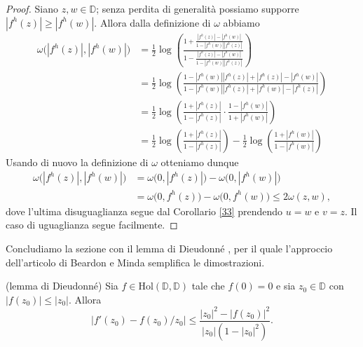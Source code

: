 \begin{proof}
  Siano $z, w \in \mathbb{D}$; senza perdita di generalità possiamo supporre $|f^h(z)| \ge |f^h(w)|$. Allora dalla definizione di $\omega$ abbiamo
  \begin{align*}
    \omega\bigl(|f^h(z)|, |f^h(w)|\bigr) & =\frac{1}{2}\log\left(\frac{1+\frac{|f^h(z)|-|f^h(w)|}{1-|f^h(w)||f^h(z)|}}{1-\frac{|f^h(z)|-|f^h(w)|}{1-|f^h(w)||f^h(z)|}}\right) \\
    & =\frac{1}{2}\log\left(\frac{1-|f^h(w)||f^h(z)|+|f^h(z)|-|f^h(w)|}{1-|f^h(w)||f^h(z)|+|f^h(w)|-|f^h(z)|}\right) \\
    & =\frac{1}{2}\log\left(\frac{1+|f^h(z)|}{1-|f^h(z)|}\cdot\frac{1-|f^h(w)|}{1+|f^h(w)|}\right) \\
    & =\frac{1}{2}\log\left(\frac{1+|f^h(z)|}{1-|f^h(z)|}\right)-\frac{1}{2}\log\left(\frac{1+|f^h(w)|}{1-|f^h(w)|}\right)
  \end{align*}
  Usando di nuovo la definizione di $\omega$ otteniamo dunque
  \begin{align*}
    \omega\bigl(|f^h(z)|, |f^h(w)|\bigr)&=\omega\bigl(0,|f^h(z)|\bigr)-\omega\bigl(0,|f^h(w)|\bigr) \\
    & =\omega\bigl(0,f^h(z)\bigr)-\omega\bigl(0,f^h(w)\bigr) \le 2\omega(z,w),
  \end{align*}
  dove l'ultima disuguaglianza segue dal Corollario \ref{33} prendendo $u=w$ e $v=z$. Il caso di uguaglianza segue facilmente.
\end{proof}

Concludiamo la sezione con il lemma di Dieudonné \cite[Chapter III, ???]{D}, per il quale l'approccio dell'articolo di Beardon e Minda semplifica le dimostrazioni.

\begin{lm}
  (lemma di Dieudonné) Sia $f \in \text{Hol}(\mathbb{D},\mathbb{D})$ tale che $f(0)=0$ e sia $z_0 \in \mathbb{D}$ con $|f(z_0)| \le |z_0|$. Allora
  \begin{equation}
    |f'(z_0)-f(z_0)/z_0| \le \frac{|z_0|^2-|f(z_0)|^2}{|z_0|(1-|z_0|^2)}.
  \end{equation}
\end{lm}

